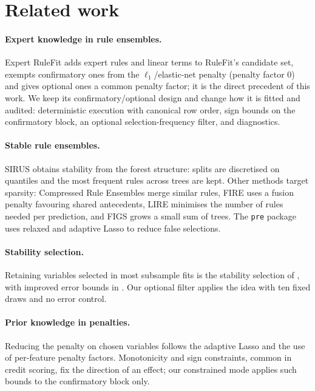 \documentclass[11pt,a4paper]{article}
\theoremstyle{definition}\newtheorem{definition}{Definition}
\begin{document}
\section{Related work}\label{sec:related}

\paragraph{Expert knowledge in rule ensembles.} Expert RuleFit \citep{ebner_erf} adds expert rules and linear terms to RuleFit's candidate set, exempts confirmatory ones from the $\ell_1$/elastic-net penalty (penalty factor 0) and gives optional ones a common penalty factor; it is the direct precedent of this work. We keep its confirmatory/optional design and change how it is fitted and audited: deterministic execution with canonical row order, sign bounds on the confirmatory block, an optional selection-frequency filter, and diagnostics.

\paragraph{Stable rule ensembles.} SIRUS \citep{benard2021} obtains stability from the forest structure: splits are discretised on quantiles and the most frequent rules across trees are kept. Other methods target sparsity: Compressed Rule Ensembles \citep{nalenz2022} merge similar rules, FIRE \citep{liu2023} uses a fusion penalty favouring shared antecedents, LIRE \citep{kanamori2023} minimises the number of rules needed per prediction, and FIGS \citep{tan2025} grows a small sum of trees. The \texttt{pre} package \citep{fokkema2020} uses relaxed and adaptive Lasso to reduce false selections.

\paragraph{Stability selection.} Retaining variables selected in most subsample fits is the stability selection of \citet{meinshausen2010}, with improved error bounds in \citet{shah2013}. Our optional filter applies the idea with ten fixed draws and no error control.

\paragraph{Prior knowledge in penalties.} Reducing the penalty on chosen variables follows the adaptive Lasso \citep{zou2006} and the use of per-feature penalty factors. Monotonicity and sign constraints, common in credit scoring, fix the direction of an effect; our constrained mode applies such bounds to the confirmatory block only.
\end{document}
